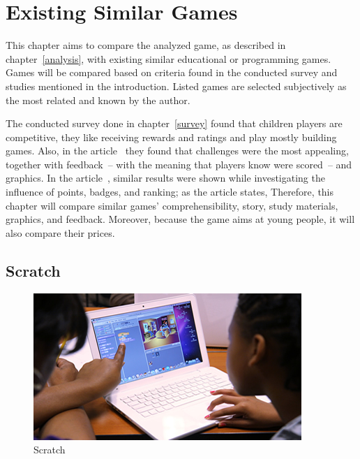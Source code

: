 \chapter{Existing Similar Games}
\label{competitive-games}

This chapter aims to compare the analyzed game, as described in chapter~\ref{analysis}, with existing similar educational or programming games.
Games will be compared based on criteria found in the conducted survey and studies mentioned in the introduction.
Listed games are selected subjectively as the most related and known by the author.

The conducted survey done in chapter~\ref{survey} found that children players are competitive, they like receiving rewards and ratings and play mostly building games.
Also, in the article~\cite{nand_2019_engaging} they found that challenges were the most appealing, together with feedback~-- with the meaning that players know were scored~-- and graphics.
In the article~\cite{smiderle_2020_the}, similar results were shown while investigating the influence of points, badges, and ranking; as the article states, 
Therefore, this chapter will compare similar games' comprehensibility, story, study materials, graphics, and feedback.
Moreover, because the game \emph{\myAppName} aims at young people, it will also compare their prices.

\newpage
\section{Scratch}
\label{similar-games:scratch}

\begin{figure}
    \centering
    \includegraphics[width=1\linewidth]{assets/similar-games/scratch.jpg}
    \caption{Scratch~\cite{a2022_scratch}}
    \label{fig:scratch}
\end{figure}

